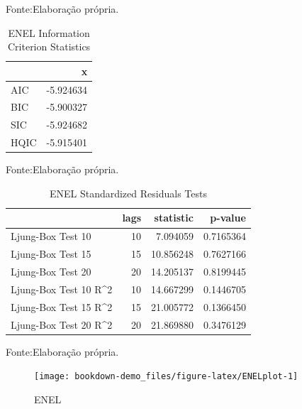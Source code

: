 \documentclass[
  12pt,
  a4paper,
  openany]{book}
\begin{document}
Fonte:Elaboração própria.

\justifying
\bigskip

\begin{table}[!h]

\caption{\label{tab:unnamed-chunk-33}ENEL Information Criterion Statistics}
\centering
\begin{tabular}[t]{lr}
\toprule
  & x\\
\midrule
AIC & -5.924634\\
BIC & -5.900327\\
SIC & -5.924682\\
HQIC & -5.915401\\
\bottomrule
\end{tabular}
\end{table}
\FloatBarrier
\centering

Fonte:Elaboração própria.

\justifying
\bigskip

\begin{table}[!h]

\caption{\label{tab:unnamed-chunk-34}ENEL Standardized Residuals Tests}
\centering
\begin{tabular}[t]{lrrr}
\toprule
  & lags & statistic & p-value\\
\midrule
Ljung-Box Test 10 & 10 & 7.094059 & 0.7165364\\
Ljung-Box Test 15 & 15 & 10.856248 & 0.7627166\\
Ljung-Box Test 20 & 20 & 14.205137 & 0.8199445\\
Ljung-Box Test 10 R\textasciicircum{}2 & 10 & 14.667299 & 0.1446705\\
Ljung-Box Test 15 R\textasciicircum{}2 & 15 & 21.005772 & 0.1366450\\
\addlinespace
Ljung-Box Test 20 R\textasciicircum{}2 & 20 & 21.869880 & 0.3476129\\
\bottomrule
\end{tabular}
\end{table}
\FloatBarrier
\centering

Fonte:Elaboração própria.

\justifying
\bigskip
\begin{figure}

{\centering \texttt{[image: bookdown-demo\_files/figure-latex/ENELplot-1]} 

}

\caption{ENEL}\label{fig:ENELplot}
\end{figure}
\FloatBarrier
\centering
\end{document}
